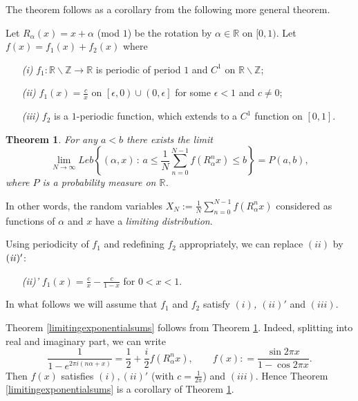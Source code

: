 \documentclass{conm-p-l}
\numberwithin{equation}{section}
\newtheorem{thm}{Theorem}
\begin{document}
The theorem follows 
as a corollary from the following more general theorem.

Let $R_{\alpha} (x) = x +\alpha $ (mod $1$) be the rotation by $\alpha \in
\mathbb{R}$ on $[0,1)$. 
Let $f(x)=f_1(x)+f_2(x)$ where
\begin{itemize}
\item[{\it(i)}]  $f_1:\mathbb{R}\backslash \mathbb{Z} \rightarrow \mathbb{R}$ is
periodic of period $1$ and $C^1$ on $\mathbb{R}\backslash \mathbb{Z}$;
\item[{\it(ii)}] $f_1(x)=\frac{c}{x}$ on  
$\left[ {\epsilon}, 0 \right) \cup  \left(0, {\epsilon}\right] $
for some
$\epsilon < 1$ and $c\ne 0$;
\item[{\it(iii)}] $f_2$
is a $1$-periodic function, which extends to a $C^1$ function on $[0,1]$.
\end{itemize}

\begin{thm}\label{limitingthm}
For any $a<b$ there exists the limit \begin{equation*}
\lim_{N\rightarrow \infty} Leb \left\{ (\alpha, x  ) {\, : \, } a\leq
\frac{1}{N}\sum_{n=0}^{N-1} f(R_{\alpha}^n x) \leq b \right\} =
P(a,b), \end{equation*} where $P$ is a probability measure on $\mathbb{R}$.
\end{thm}
In other words, the random variables $X_N:=\frac{1}{N}\sum_{n=0}^{N-1}
f(R_{\alpha}^n x)$ considered as functions of $\alpha$ and $x$
have a \emph{limiting distribution}.

Using periodicity of $f_1$ and redefining $f_2$ appropriately, we
can replace {\it $(ii)$} by ${\it (ii)'}$:
\begin{itemize}
\item[{\it (ii)'}] $f_1(x) = \frac{c}{x} - \frac{c}{1-x}$ for $0 < x < 1$.
\end{itemize}

In what follows we will assume that $f_1$ and $f_2$ satisfy {\it $(i)$, $(ii)'$}
and {\it $(iii)$}.

Theorem \ref{limitingexponentialsums}  follows from  Theorem
\ref{limitingthm}. Indeed, splitting into real and imaginary part,
we can write \begin{equation*}
 \frac{1}{1- e^{2\pi i (n\alpha + x)} } = \frac{1}{2} + \frac{i}{2}  f( R_{\alpha}^n x) ,
\qquad f(x): = \frac{\sin 2\pi x}{1- \cos 2\pi x} .
\end{equation*}
Then $f(x)$
satisfies {\it $(i), (ii)'$ } (with $c=\frac{1}{2\pi}$)  and {\it
$(iii)$}. Hence Theorem \ref{limitingexponentialsums} is a
corollary of Theorem \ref{limitingthm}.
\end{document}
